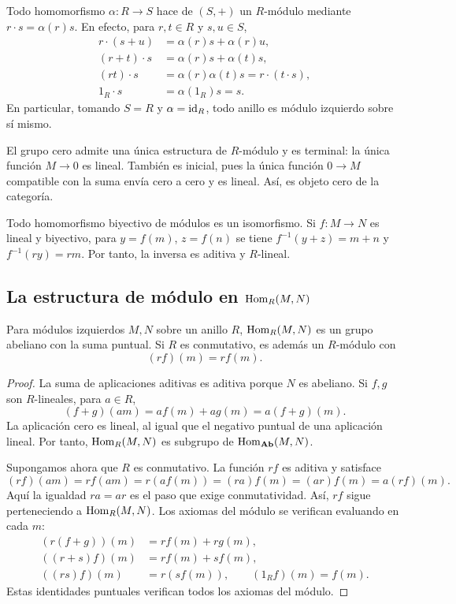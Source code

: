 \begin{ejem}\label{ejem:C13-restriccion}
Todo homomorfismo $\alpha:R\to S$ hace de $(S,+)$ un $R$-módulo mediante $r\cdot s=\alpha(r)s$. En efecto, para $r,t\in R$ y $s,u\in S$,
\[
\begin{aligned}
r\cdot(s+u)&=\alpha(r)s+\alpha(r)u,\\
(r+t)\cdot s&=\alpha(r)s+\alpha(t)s,\\
(rt)\cdot s&=\alpha(r)\alpha(t)s
=r\cdot(t\cdot s),\\
1_R\cdot s&=\alpha(1_R)s=s.
\end{aligned}
\]
En particular, tomando $S=R$ y $\alpha=\operatorname{id}_R$, todo anillo es módulo izquierdo sobre sí mismo.
\end{ejem}

El grupo cero admite una única estructura de $R$-módulo y es terminal: la única función $M\to0$ es lineal. También es inicial, pues la única función $0\to M$ compatible con la suma envía cero a cero y es lineal. Así, es objeto cero de la categoría.

Todo homomorfismo biyectivo de módulos es un isomorfismo. Si $f:M\to N$ es lineal y biyectivo, para $y=f(m)$, $z=f(n)$ se tiene $f^{-1}(y+z)=m+n$ y $f^{-1}(ry)=rm$. Por tanto, la inversa es aditiva y $R$-lineal.

\subsection{La estructura de módulo en \texorpdfstring{$\operatorname{Hom}_R(M,N)$}{Hom}}\label{tema:13-3-2}
\begin{prop}\label{prop:C13-Hom}
Para módulos izquierdos $M,N$ sobre un anillo $R$, $\operatorname{Hom}_R(M,N)$ es un grupo abeliano con la suma puntual. Si $R$ es conmutativo, es además un $R$-módulo con
\[
(rf)(m)=rf(m).
\]
\end{prop}
\begin{proof}
La suma de aplicaciones aditivas es aditiva porque $N$ es abeliano. Si $f,g$ son $R$-lineales, para $a\in R$,
\[
(f+g)(am)=af(m)+ag(m)=a(f+g)(m).
\]
La aplicación cero es lineal, al igual que el negativo puntual de una aplicación lineal. Por tanto, $\operatorname{Hom}_R(M,N)$ es subgrupo de $\operatorname{Hom}_{\mathbf{Ab}}(M,N)$.

Supongamos ahora que $R$ es conmutativo. La función $rf$ es aditiva y satisface
\[
(rf)(am)=rf(am)=r(af(m))=(ra)f(m)
=(ar)f(m)=a(rf)(m).
\]
Aquí la igualdad $ra=ar$ es el paso que exige conmutatividad. Así, $rf$ sigue perteneciendo a $\operatorname{Hom}_R(M,N)$. Los axiomas del módulo se verifican evaluando en cada $m$:
\[
\begin{aligned}
(r(f+g))(m)&=rf(m)+rg(m),\\
((r+s)f)(m)&=rf(m)+sf(m),\\
((rs)f)(m)&=r(sf(m)),\qquad (1_Rf)(m)=f(m).
\end{aligned}
\]
Estas identidades puntuales verifican todos los axiomas del módulo.
\end{proof}

